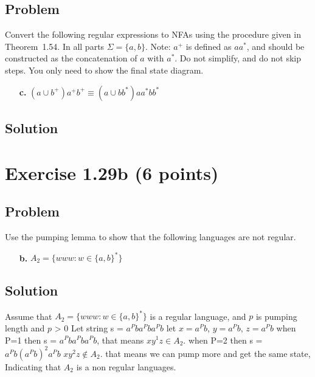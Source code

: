 \documentclass{article}
\begin{document}
\begin{empfile}
\subsection*{Problem}

Convert the following regular expressions to NFAs using the
procedure given in Theorem~1.54. In all parts $\Sigma=\{a,b\}$.
Note: $a^+$ is defined as $aa^*$, and should be constructed as the
concatenation of $a$ with $a^*$. Do not simplify, and do not skip
steps. You only need to show the final state diagram.

\begin{enumerate}
\item[\bfseries c.] $(a\cup b^+)a^+b^+\equiv(a\cup bb^*)aa^*bb^*$
\end{enumerate}

\subsection*{Solution}

\section*{Exercise 1.29b (6 points)}

\subsection*{Problem}

Use the pumping lemma to show that the following languages are not regular.
\begin{enumerate}
\item[\bfseries b.] $A_2=\{www:w\in\{a,b\}^*\}$
\end{enumerate}

\subsection*{Solution}

Assume that $A_2=\{www:w\in\{a,b\}^*\}$ is a regular language, and $p$ is pumping length and $p$ > 0 \newline
Let string s = $a^P ba^P ba^P b$
let $x = a^Pb$, $y = a^Pb$, $z = a^Pb$\newline
when P=1 then s = $a^P ba^P ba^P b$, that means $xy^1z \in A_2$. \newline
when P=2 then s = $a^P b(a^P b)^2 a^P b$ $xy^2z \notin A_2$. \newline
that means we can pump more and get the same state, Indicating that $A_2$ is a non regular languages.


\end{empfile}
\end{document}
